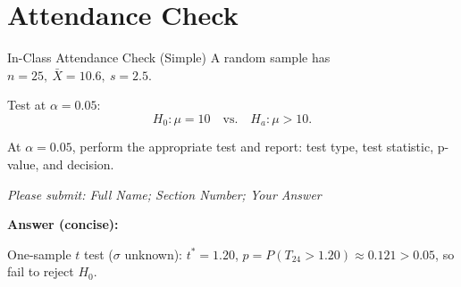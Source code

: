 \documentclass[aspectratio=169]{beamer}
\begin{document}
\section{Attendance Check}

\begin{frame}{In-Class Attendance Check (Simple)}
  A random sample has \(n=25,\ \bar X=10.6,\ s=2.5\).

  Test at \(\alpha=0.05\):
  \[
    H_0:\mu=10
    \quad\text{vs.}\quad
    H_a:\mu>10.
  \]

  At \(\alpha=0.05\), perform the appropriate test and report:
  test type, test statistic, p-value, and decision.

  \vspace{2mm}
  \textit{Please submit: Full Name; Section Number; Your Answer}

  \pause
  \vspace{2mm}
  \textbf{Answer (concise):}

  One-sample \(t\) test (\(\sigma\) unknown):
  \(t^*=1.20\), \(p=P(T_{24}>1.20)\approx0.121>0.05\),
  so fail to reject \(H_0\).
\end{frame}
\end{document}
